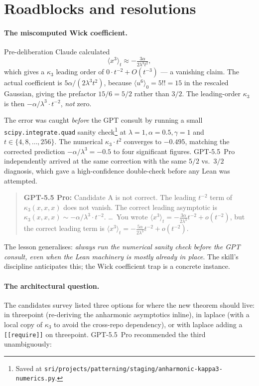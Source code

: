 \documentclass[11pt]{article}
\newcommand{\gptbox}[1]{\par\medskip\begin{quote}\small\textbf{\textcolor{green!50!black}{GPT-5.5 Pro:}} #1\end{quote}\medskip}
\begin{document}
\section{Roadblocks and resolutions}\label{sec:roadblocks}

\paragraph{The miscomputed Wick coefficient.} Pre-deliberation Claude
calculated
\[
  \langle x^3 \rangle_t \approx -\tfrac{3\alpha}{2 \lambda^3 t^2},
\]
which gives a $\kappa_3$ leading order of $0 \cdot t^{-2} + O(t^{-3})$
--- a vanishing claim. The actual coefficient is
$5\alpha/(2\lambda^3 t^2)$, because $\langle u^6 \rangle_0 = 5!! = 15$
in the rescaled Gaussian, giving the prefactor $15/6 = 5/2$ rather than
$3/2$. The leading-order $\kappa_3$ is then $-\alpha/\lambda^3 \cdot t^{-2}$,
\emph{not} zero.

The error was caught \emph{before} the GPT consult by running a small
\texttt{scipy.integrate.quad} sanity check\footnote{Saved at
\texttt{sri/projects/patterning/staging/anharmonic-kappa3-numerics.py}.}
at $\lambda = 1, \alpha = 0.5, \gamma = 1$ and $t \in \{4, 8, \dots, 256\}$.
The numerical $\kappa_3 \cdot t^2$ converges to $-0.495$, matching the
corrected prediction $-\alpha/\lambda^3 = -0.5$ to four significant
figures. GPT-5.5~Pro independently arrived at the same correction with
the same $5/2$ vs.\ $3/2$ diagnosis, which gave a high-confidence
double-check before any Lean was attempted.

\gptbox{Candidate A is not correct. The leading $t^{-2}$ term of
$\kappa_3(x,x,x)$ does not vanish. The correct leading asymptotic is
$\kappa_3(x,x,x) \sim -\alpha/\lambda^3 \cdot t^{-2}$. \dots\
You wrote $\langle x^3\rangle_t = -\frac{3\alpha}{2\lambda^3} t^{-2}
+ o(t^{-2})$, but the correct leading term is
$\langle x^3\rangle_t = -\frac{5\alpha}{2\lambda^3} t^{-2} + o(t^{-2})$.}

The lesson generalises: \emph{always run the numerical sanity check
before the GPT consult, even when the Lean machinery is mostly already
in place}. The skill's discipline anticipates this; the Wick coefficient
trap is a concrete instance.

\paragraph{The architectural question.} The candidates survey listed
three options for where the new theorem should live: in threepoint
(re-deriving the anharmonic asymptotics inline), in laplace (with a
local copy of $\kappa_3$ to avoid the cross-repo dependency), or with
laplace adding a \texttt{[[require]]} on threepoint. GPT-5.5~Pro
recommended the third unambiguously:
\end{document}
